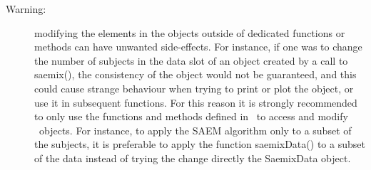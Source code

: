 \begin{description}
 \item[Warning:] modifying the elements in the objects outside of dedicated functions or methods can have unwanted side-effects. For instance, if one was to change the number of subjects in the data slot of an object created by a call to {\sf saemix()}, the consistency of the object would not be guaranteed, and this could cause strange behaviour when trying to print or plot the object, or use it in subsequent functions. For this reason it is strongly recommended to only use the functions and methods defined in \monolix~to access and modify \monolix~objects. For instance, to apply the SAEM algorithm only to a subset of the subjects, it is preferable to apply the function {\sf saemixData()} to a subset of the data instead of trying the change directly the {\sf SaemixData} object.
\end{description}

